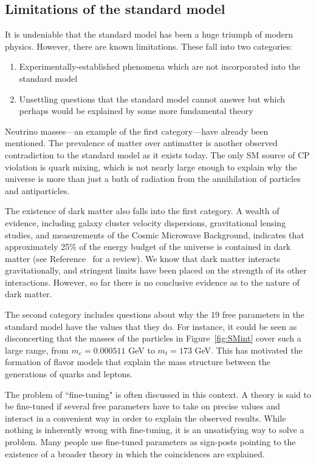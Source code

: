 \subsection{Limitations of the standard model}
\label{sec:SMweakness}
It is undeniable that the standard model has been a huge triumph of modern physics. However, there are known limitations. These fall into two categories: 
\begin{enumerate}[leftmargin=*]
	\item Experimentally-established phenomena which are not incorporated into the standard model
	\item Unsettling questions that the standard model cannot answer but which perhaps would be explained by some more fundamental theory
\end{enumerate}

Neutrino masses---an example of the first category---have already been mentioned. The prevalence of matter over antimatter is another observed contradiction to the standard model as it exists today. The only SM source of CP violation is quark mixing, which is not nearly large enough to explain why the universe is more than just a bath of radiation from the annihilation of particles and antiparticles. 

The existence of dark matter also falls into the first category. A wealth of evidence, including galaxy cluster velocity dispersions, gravitational lensing studies, and measurements of the Cosmic Microwave Background, indicates that approximately 25\% of the energy budget of the universe is contained in dark matter (see Reference~\cite{DarkMatterReview} for a review). We know that dark matter interacts gravitationally, and stringent limits have been placed on the strength of its other interactions. However, so far there is no conclusive evidence as to the nature of dark matter.

The second category includes questions about why the 19 free parameters in the standard model have the values that they do. For instance, it could be seen as disconcerting that the masses of the particles in Figure~\ref{fig:SMint} cover such a large range, from $m_e = 0.000511$ GeV to $m_t = 173$ GeV. This 
has motivated the formation of flavor models that explain the mass structure between the generations of quarks and leptons.

The problem of ``fine-tuning" is often discussed in this context. A theory is said to be fine-tuned if several free parameters have to take on precise values and interact in a convenient way in order to explain the observed results. While nothing is inherently wrong with fine-tuning, it is an unsatisfying way to solve a problem. Many people use fine-tuned parameters as sign-posts pointing to the existence of a broader theory in which the coincidences are explained.


